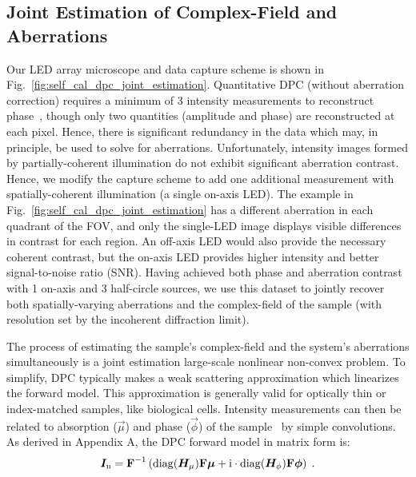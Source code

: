 \subsection{Joint Estimation of Complex-Field and Aberrations}

Our LED array microscope and data capture scheme is shown in Fig.~\ref{fig:self_cal_dpc_joint_estimation}. Quantitative DPC (without aberration correction) requires a minimum of 3 intensity measurements to reconstruct phase~\cite{PhillipsChen17cDPC}, though only two quantities (amplitude and phase) are reconstructed at each pixel. Hence, there is significant redundancy in the data which may, in principle, be used to solve for aberrations. Unfortunately, intensity images formed by partially-coherent illumination do not exhibit significant aberration contrast. Hence, we modify the capture scheme to add one additional measurement with spatially-coherent illumination (a single on-axis LED). The example in Fig.~\ref{fig:self_cal_dpc_joint_estimation} has a different aberration in each quadrant of the FOV, and only the single-LED image displays visible differences in contrast for each region. An off-axis LED would also provide the necessary coherent contrast, but the on-axis LED provides higher intensity and better signal-to-noise ratio (SNR). Having achieved both phase and aberration contrast with 1 on-axis and 3 half-circle sources, we use this dataset to jointly recover both spatially-varying aberrations and the complex-field of the sample (with resolution set by the incoherent diffraction limit).

The process of estimating the sample's complex-field and the system's aberrations simultaneously is a joint estimation large-scale nonlinear non-convex problem. To simplify, DPC typically makes a weak scattering approximation which linearizes the forward model. This approximation is generally valid for optically thin or index-matched samples, like biological cells. Intensity measurements can then be related to absorption ($\vec{\mu}$) and phase ($\vec{\phi}$) of the sample~\cite{tian2015quantitative,PhillipsChen17cDPC} by simple convolutions. As derived in Appendix A, the DPC forward model in matrix form is:
\begin{equation}
\label{eq:forwardmodel}
\bm{I}_{\mathrm{n}} = \boldsymbol{\mathbf{F}}^{-1}\left(\mathrm{diag}(\bm{H}_{\mu})\boldsymbol{\mathbf{F}}\bm{\mu} + \mathrm{i}\cdot\mathrm{diag}(\bm{H}_{\phi})\boldsymbol{\mathbf{F}}\bm{\phi}\right)\;.
\end{equation}


